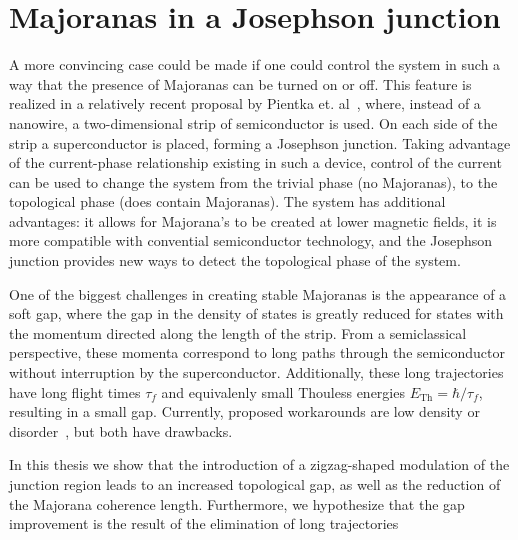 \section{Majoranas in a Josephson junction}
	A more convincing case could be made if one could control the system in such a way that the presence of Majoranas can be turned on or off.
	This feature is realized in a relatively recent proposal by Pientka et. al~\cite{pientka_topological_2017}, where, instead of a nanowire, a two-dimensional strip of semiconductor is used.
	On each side of the strip a superconductor is placed, forming a Josephson junction.
	Taking advantage of the current-phase relationship existing in such a device, control of the current can be used to change the system from the trivial phase (no Majoranas), to the topological phase (does contain Majoranas).
	The system has additional advantages: it allows for Majorana's to be created at lower magnetic fields, it is more compatible with convential semiconductor technology, and the Josephson junction provides new ways to detect the topological phase of the system.

	One of the biggest challenges in creating stable Majoranas is the appearance of a soft gap, where the gap in the density of states is greatly reduced for states with the momentum directed along the length of the strip.
	From a semiclassical perspective, these momenta correspond to long paths through the semiconductor without interruption by the superconductor.
	Additionally, these long trajectories have long flight times $\tau_f$ and equivalenly small Thouless energies $E_{\textrm{Th}}=\hbar / \tau_f$, resulting in a small gap. 
	Currently, proposed workarounds are low density or disorder~\cite{haim_double-edge_2018}, but both have drawbacks.

	In this thesis we show that the introduction of a zigzag-shaped modulation of the junction region leads to an increased topological gap, as well as the reduction of the Majorana coherence length.
	Furthermore, we hypothesize that the gap improvement is the result of the elimination of long trajectories